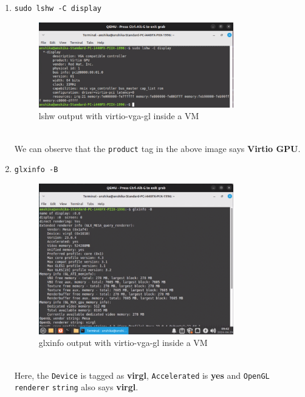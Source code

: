 \documentclass[a4paper,12pt, final]{report}
\begin{document}
\begin{enumerate}
    \item \verb|sudo lshw -C display|\\
            \begin{figure}[H]
                \centering
                \includegraphics[width=0.8\textwidth]{images/virtio_gpu_lshw.png}
                \caption{lshw output with virtio-vga-gl inside a VM}
                \label{fig:lshw_hw_accel_vm}
            \end{figure}\\
            We can observe that the \verb|product| tag in the above image says \textbf{Virtio GPU}.
    \item \verb|glxinfo -B|\\
            \begin{figure}[H]
                \centering
                \includegraphics[width=0.8\textwidth]{images/virtio_gpu_glxinfo.png}
                \caption{glxinfo output with virtio-vga-gl inside a VM}
                \label{fig:glxinfo_hw_accel_vm}
            \end{figure}\\
            Here, the \verb|Device| is tagged as \textbf{virgl}, \verb|Accelerated| is \textbf{yes} and \verb|OpenGL renderer| \verb|string| also says \textbf{virgl}.

\end{enumerate}
\end{document}
